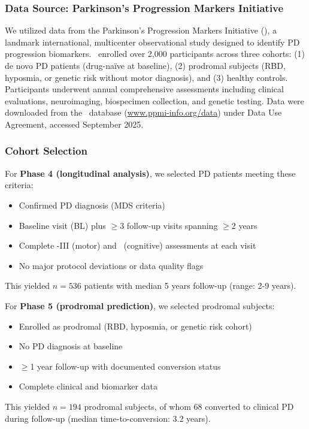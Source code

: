 
\subsubsection{Data Source: Parkinson's Progression Markers Initiative}

We utilized data from the Parkinson's Progression Markers Initiative (\ppmi), a landmark international, multicenter observational study designed to identify PD progression biomarkers\cite{marek2018parkinson}. \ppmi\ enrolled over 2,000 participants across three cohorts: (1) de novo PD patients (drug-naïve at baseline), (2) prodromal subjects (RBD, hyposmia, or genetic risk without motor diagnosis), and (3) healthy controls. Participants underwent annual comprehensive assessments including clinical evaluations, neuroimaging, biospecimen collection, and genetic testing. Data were downloaded from the \ppmi\ database (\url{www.ppmi-info.org/data}) under Data Use Agreement, accessed September 2025.

\subsubsection{Cohort Selection}

For \textbf{Phase 4 (longitudinal analysis)}, we selected PD patients meeting these criteria:
\begin{itemize}
    \item Confirmed PD diagnosis (MDS criteria\cite{postuma2015mds})
    \item Baseline visit (BL) plus $\geq$3 follow-up visits spanning $\geq$2 years
    \item Complete \updrs-III (motor) and \moca\ (cognitive) assessments at each visit
    \item No major protocol deviations or data quality flags
\end{itemize}
This yielded $n=536$ patients with median 5 years follow-up (range: 2-9 years).

For \textbf{Phase 5 (prodromal prediction)}, we selected prodromal subjects:
\begin{itemize}
    \item Enrolled as prodromal (RBD, hyposmia, or genetic risk cohort)
    \item No PD diagnosis at baseline
    \item $\geq$1 year follow-up with documented conversion status
    \item Complete clinical and biomarker data
\end{itemize}
This yielded $n=194$ prodromal subjects, of whom 68 converted to clinical PD during follow-up (median time-to-conversion: 3.2 years).


